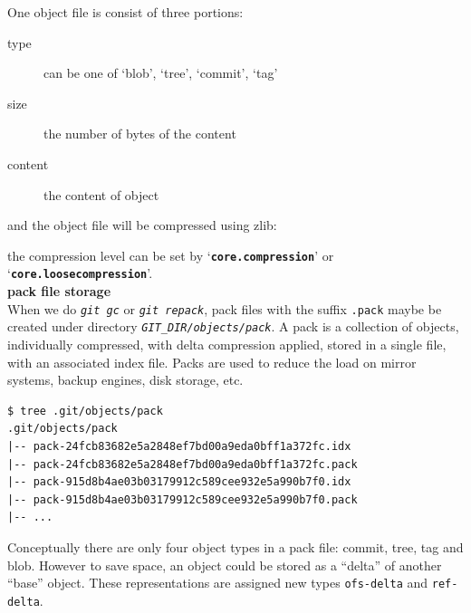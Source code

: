\documentclass[12pt,oneside]{article}
\newcommand{\code}[1]{\texttt{#1}}
\begin{document}
One object file is consist of three portions:
\begin{description}
  \item[type] can be one of `blob', `tree', `commit', `tag'
  \item[size] the number of bytes of the content
  \item[content] the content of object
\end{description}

and the object file will be compressed using zlib:


the compression level can be set by `\textbf{\code{core.compression}}' or `\textbf{\code{core.loosecompression}}'.
\\

\textbullet\textbf{\large{ pack file storage}}\\

When we do \emph{\code{git gc}} or \emph{\code{git repack}}, pack files with the suffix \code{.pack}
maybe be created under directory \emph{\code{GIT\_DIR/objects/pack}}. A pack is a collection of objects,
individually compressed, with delta compression applied, stored in a single file, with an associated
index file. Packs are used to reduce the load on mirror systems, backup engines, disk storage, etc.

\begin{lstlisting}[basicstyle=\ttfamily]
$ tree .git/objects/pack
.git/objects/pack
|-- pack-24fcb83682e5a2848ef7bd00a9eda0bff1a372fc.idx
|-- pack-24fcb83682e5a2848ef7bd00a9eda0bff1a372fc.pack
|-- pack-915d8b4ae03b03179912c589cee932e5a990b7f0.idx
|-- pack-915d8b4ae03b03179912c589cee932e5a990b7f0.pack
|-- ...
\end{lstlisting}

Conceptually there are only four object types in a pack file: commit, tree, tag and blob.
However to save space, an object could be stored as a ``delta'' of another ``base'' object.
These representations are assigned new types \code{ofs-delta} and \code{ref-delta}.
\end{document}
